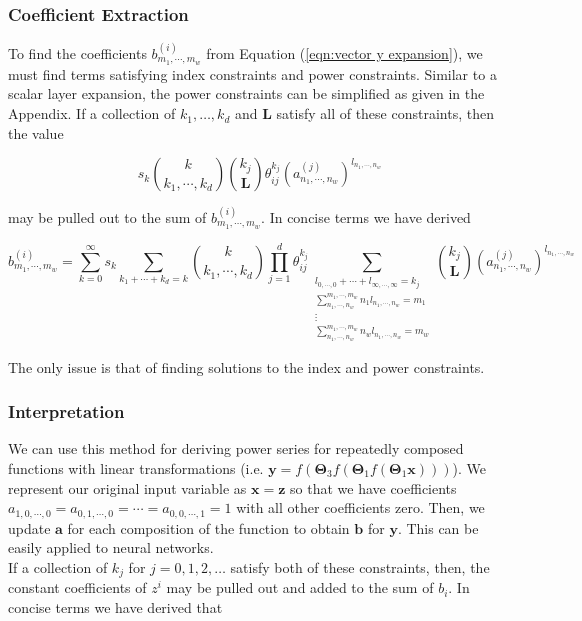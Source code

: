 \subsubsection{Coefficient Extraction}

To find the coefficients $b^{(i)}_{m_1, \cdots, m_w}$ from Equation (\ref{eqn:vector y expansion}), we must find terms satisfying index constraints and power constraints. Similar to a scalar layer expansion, the power constraints can be simplified as given in the Appendix. If a collection of $k_1, \ldots, k_d$ and $\mathbf{L}$ satisfy all of these constraints, then the value

\begin{equation*}
    s_k \binom{k}{k_1, \cdots, k_d} \binom{k_j}{\mathbf{L}} \theta_{ij}^{k_j} (a^{(j)}_{n_1, \cdots, n_w})^{l_{n_1, \cdots, n_w}}
\end{equation*}

may be pulled out to the sum of $b^{(i)}_{m_1, \cdots, m_w}$. In concise terms we have derived

\begin{equation}
    b^{(i)}_{m_1, \cdots, m_w} = \sum_{k=0}^{\infty} s_k \sum_{k_1 + \cdots + k_d = k} \binom{k}{k_1, \cdots, k_d} \prod_{j=1}^{d} \theta_{ij}^{k_j} \sum_{\substack{l_{0, \cdots, 0} + \cdots + l_{\infty, \cdots, \infty} = k_j \\ \sum_{n_1, \cdots, n_w}^{m_1, \cdots, m_w} n_1 l_{n_1, \cdots, n_w} = m_1 \\ \vdots \\ \sum_{n_1, \cdots, n_w}^{m_1, \cdots, m_w} n_w l_{n_1, \cdots, n_w} = m_w}} \binom{k_j}{\mathbf{L}} (a^{(j)}_{n_1, \cdots, n_w})^{l_{n_1, \cdots, n_w}}
\end{equation}

The only issue is that of finding solutions to the index and power constraints.

\subsubsection{Interpretation}

We can use this method for deriving power series for repeatedly composed functions with linear transformations (i.e. $\mathbf{y} = f(\mathbf{\Theta}_3 f(\mathbf{
\Theta}_1 f(\mathbf{\Theta}_1 \mathbf{x})))$). We represent our original input variable as $\mathbf{x} = \mathbf{z}$ so that we have coefficients $a_{1, 0, \cdots, 0} = a_{0, 1, \cdots, 0} = \cdots = a_{0, 0, \cdots, 1} = 1$ with all other coefficients zero. Then, we update $\mathbf{a}$ for each composition of the function to obtain $\mathbf{b}$ for $\mathbf{y}$. This can be easily applied to neural networks.\\
If a collection of $k_j$ for $j = 0, 1, 2, \ldots$ satisfy both of these constraints, then, the constant coefficients of $z^i$ may be pulled out and added to the sum of $b_i$. In concise terms we have derived that

